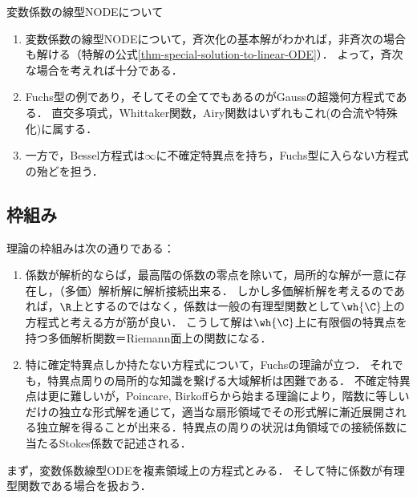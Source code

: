 \documentclass[uplatex,dvipdfmx]{jsreport}
\begin{document}
\begin{tcolorbox}[colframe=ForestGreen, colback=ForestGreen!10!white,breakable,colbacktitle=ForestGreen!40!white,coltitle=black,fonttitle=\bfseries\sffamily,
title=]
    変数係数の線型NODEについて
    \begin{enumerate}
        \item 変数係数の線型NODEについて，斉次化の基本解がわかれば，非斉次の場合も解ける（特解の公式\ref{thm-special-solution-to-linear-ODE}）．
        よって，斉次な場合を考えれば十分である．
        \item Fuchs型の例であり，そしてその全てでもあるのがGaussの超幾何方程式である．
        直交多項式，Whittaker関数，Airy関数はいずれもこれ(の合流や特殊化)に属する．
        \item 一方で，Bessel方程式は$\infty$に不確定特異点を持ち，Fuchs型に入らない方程式の殆どを担う．
    \end{enumerate}
\end{tcolorbox}

\subsection{枠組み}

\begin{tcolorbox}[colframe=ForestGreen, colback=ForestGreen!10!white,breakable,colbacktitle=ForestGreen!40!white,coltitle=black,fonttitle=\bfseries\sffamily,
title=]
    理論の枠組みは次の通りである\cite{大島利雄-ODE}：
    \begin{enumerate}
        \item 係数が解析的ならば，最高階の係数の零点を除いて，局所的な解が一意に存在し，（多価）解析解に解析接続出来る．
        しかし多価解析解を考えるのであれば，$\R$上とするのではなく，係数は一般の有理型関数として$\wh{\C}$上の方程式と考える方が筋が良い．
        こうして解は$\wh{\C}$上に有限個の特異点を持つ多価解析関数＝Riemann面上の関数になる．
        \item 特に確定特異点しか持たない方程式について，Fuchsの理論が立つ．
        それでも，特異点周りの局所的な知識を繋げる大域解析は困難である．
        不確定特異点は更に難しいが，Poincare, Birkoffらから始まる理論により，階数に等しいだけの独立な形式解を通じて，適当な扇形領域でその形式解に漸近展開される独立解を得ることが出来る．特異点の周りの状況は角領域での接続係数に当たるStokes係数で記述される．
    \end{enumerate}
    まず，変数係数線型ODEを複素領域上の方程式とみる．
    そして特に係数が有理型関数である場合を扱おう．
\end{tcolorbox}
\end{document}
